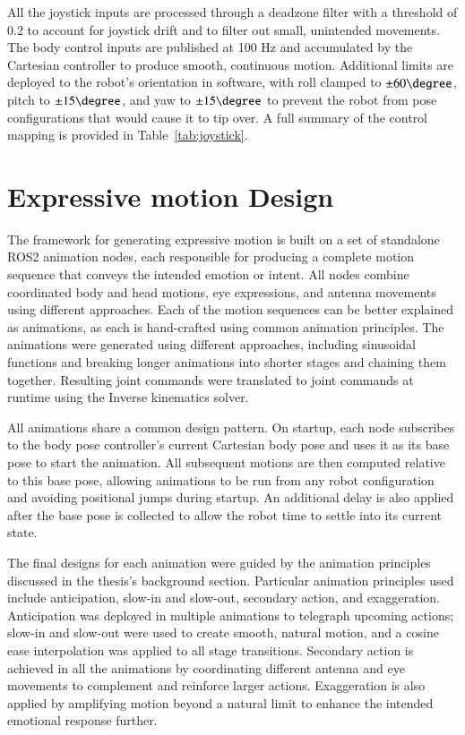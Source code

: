 All the joystick inputs are processed through a deadzone filter with a threshold of 0.2 to account for joystick drift and to filter out small, unintended movements. The body control inputs are published at 100 Hz and accumulated by the Cartesian controller to produce smooth, continuous motion. Additional limits are deployed to the robot's orientation in software, with roll clamped to $\pm60\degree$, pitch to $\pm15\degree$, and 
yaw to $\pm15\degree$ to prevent the robot from pose configurations that would cause it to tip over. A full summary of the control mapping is provided in Table~\ref{tab:joystick}.




\section{Expressive motion Design}
The framework for generating expressive motion is built on a set of standalone ROS2 animation nodes, each responsible for producing a complete motion sequence that conveys the intended emotion or intent. All nodes combine coordinated body and head motions, eye expressions, and antenna movements using different approaches. Each of the motion sequences can be better explained as animations, as each is hand-crafted using common animation principles. The animations were generated using different approaches, including sinusoidal functions and breaking longer animations into shorter stages and chaining them together. Resulting joint commands were translated to joint commands at runtime using the Inverse kinematics solver. 

All animations share a common design pattern. On startup, each node subscribes to the body pose controller's current Cartesian body pose and uses it as its base pose to start the animation. All subsequent motions are then computed relative to this base pose, allowing animations to be run from any robot configuration and avoiding positional jumps during startup. An additional delay is also applied after the base pose is collected to allow the robot time to settle into its current state.

The final designs for each animation were guided by the animation principles discussed in the thesis's background section. Particular animation principles used include anticipation, slow-in and slow-out, secondary action, and exaggeration. Anticipation was deployed in multiple animations to telegraph upcoming actions; slow-in and slow-out were used to create smooth, natural motion, and a cosine ease interpolation was applied to all stage transitions. Secondary action is achieved in all the animations by coordinating different antenna and eye movements to complement and reinforce larger actions. Exaggeration is also applied by amplifying motion beyond a natural limit to enhance the intended emotional response further.

